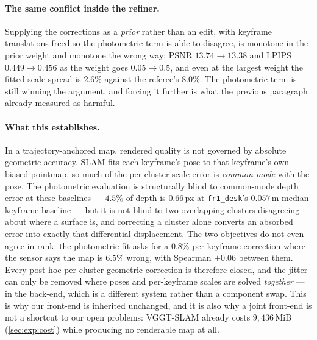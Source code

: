 \paragraph{The same conflict inside the refiner.}
Supplying the corrections as a \emph{prior} rather than an edit, with keyframe
translations freed so the photometric term is able to disagree, is monotone in
the prior weight and monotone the wrong way: PSNR $13.74\rightarrow13.38$ and
LPIPS $0.449\rightarrow0.456$ as the weight goes $0.05\rightarrow0.5$, and
even at the largest weight the fitted scale spread is $2.6\%$ against the
referee's $8.0\%$. The photometric term is still winning the argument, and
forcing it further is what the previous paragraph already measured as harmful.

\paragraph{What this establishes.}
In a trajectory-anchored map, rendered quality is not governed by absolute
geometric accuracy. SLAM fits each keyframe's pose to that keyframe's own
biased pointmap, so much of the per-cluster scale error is \emph{common-mode}
with the pose. The photometric evaluation is structurally blind to common-mode
depth error at these baselines --- $4.5\%$ of depth is $0.66$\,px at
\texttt{fr1\_desk}'s $0.057$\,m median keyframe baseline --- but it is not
blind to two overlapping clusters disagreeing about where a surface is, and
correcting a cluster alone converts an absorbed error into exactly that
differential displacement. The two objectives do not even agree in rank: the
photometric fit asks for a $0.8\%$ per-keyframe correction where the sensor
says the map is $6.5\%$ wrong, with Spearman $+0.06$ between them. Every
post-hoc per-cluster geometric correction is therefore closed, and the jitter
can only be removed where poses and per-keyframe scales are solved
\emph{together} --- in the back-end, which is a different system rather than a
component swap. This is why our front-end is inherited unchanged, and it is
also why a joint front-end is not a shortcut to our open problems: VGGT-SLAM
already costs $9{,}436$\,MiB (\cref{sec:exp:cost}) while producing no
renderable map at all.

